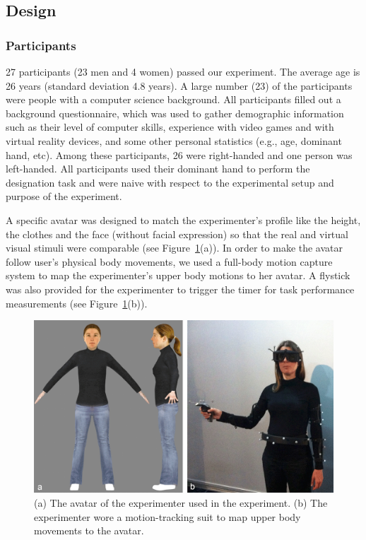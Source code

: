 \subsection{Design}
\subsubsection{Participants}
27 participants (23 men and 4 women) passed our experiment. The average age is 26 years (standard deviation 4.8 years).
A large number (23) of the participants were people with a computer science background. All participants filled out a background questionnaire, which was used to gather demographic information such as their level of computer skills, experience with video games and with virtual reality devices, and some other personal statistics (e.g., age, dominant hand, etc). Among these participants, 26 were right-handed and one person was left-handed. All participants used their dominant hand to perform the designation task and were naive with respect to the experimental setup and purpose of the experiment.

A specific avatar was designed to match the experimenter's profile like the height, the clothes and the face (without facial expression) so that the real and virtual visual stimuli were comparable (see Figure~\ref{fig:2_avatar}(a)). In order to make the avatar follow user's physical body movements, we used a full-body motion capture system to map the experimenter's upper body motions to her avatar. A flystick was also provided for the experimenter to trigger the timer for task performance measurements (see Figure~\ref{fig:2_avatar}(b)).

\begin{figure}[tb]
  \centering
  \includegraphics[width=\textwidth]{figures/2_avatar_photo}
  \caption{\label{fig:2_avatar}(a) The avatar of the experimenter used in the experiment. (b) The experimenter wore a motion-tracking suit to map upper body movements to the avatar.}
\end{figure}

